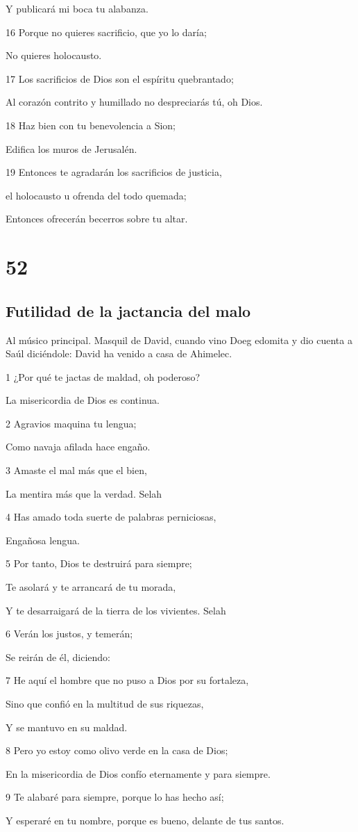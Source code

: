 \par Y publicará mi boca tu alabanza.
\par 16 Porque no quieres sacrificio, que yo lo daría;
\par No quieres holocausto.
\par 17 Los sacrificios de Dios son el espíritu quebrantado;
\par Al corazón contrito y humillado no despreciarás tú, oh Dios.
\par 18 Haz bien con tu benevolencia a Sion;
\par Edifica los muros de Jerusalén.
\par 19 Entonces te agradarán los sacrificios de justicia,
\par el holocausto u ofrenda del todo quemada;
\par Entonces ofrecerán becerros sobre tu altar.

\chapter{52}

\section*{Futilidad de la jactancia del malo}

\par Al músico principal. Masquil de David, cuando vino Doeg edomita y dio cuenta a Saúl diciéndole: David ha venido a casa de Ahimelec.

\par 1 ¿Por qué te jactas de maldad, oh poderoso?
\par La misericordia de Dios es continua.
\par 2 Agravios maquina tu lengua;
\par Como navaja afilada hace engaño.
\par 3 Amaste el mal más que el bien,
\par La mentira más que la verdad. Selah
\par 4 Has amado toda suerte de palabras perniciosas,
\par Engañosa lengua.
\par 5 Por tanto, Dios te destruirá para siempre;
\par Te asolará y te arrancará de tu morada,
\par Y te desarraigará de la tierra de los vivientes. Selah
\par 6 Verán los justos, y temerán;
\par Se reirán de él, diciendo:
\par 7 He aquí el hombre que no puso a Dios por su fortaleza,
\par Sino que confió en la multitud de sus riquezas,
\par Y se mantuvo en su maldad.
\par 8 Pero yo estoy como olivo verde en la casa de Dios;
\par En la misericordia de Dios confío eternamente y para siempre.
\par 9 Te alabaré para siempre, porque lo has hecho así;
\par Y esperaré en tu nombre, porque es bueno, delante de tus santos.

